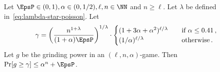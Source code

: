     \begin{lemma}\label{lemma:xor-game-poisson-gamma}
        Let $\EpsP \in (0, 1), \alpha \in (0, 1/2), \ell, n \in \NN$ and $n \geq \ell$. 
        Let $\lambda$ be defined in~\eqref{eq:lambda-star-poisson}.
        Let 
        \begin{equation}
            \label{eq:xor-poisson-tail-gamma}
            \gamma = \left(\frac{n^{1 + \lambda} }{ (1+\alpha) \EpsP} \right)^{1/\lambda}
                \cdot \begin{cases}
                    (1 + 3 \alpha + \alpha^2)^{\ell/\lambda} &\quad\text{if $\alpha \leq 0.41$\,,} \\
                    (1/\alpha)^{\ell/\lambda} &\quad\text{otherwise\,.}
                \end{cases}
        \end{equation}
        Let $g$ be the grinding power in an $(\ell, n, \alpha)$-game. 
        Then $\Pr[g \geq \gamma] \leq \alpha^n + \EpsP$.
    \end{lemma}
